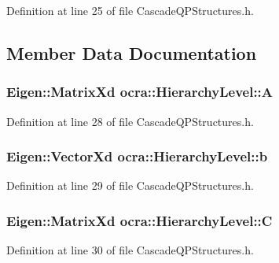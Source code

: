 Definition at line 25 of file Cascade\+Q\+P\+Structures.\+h.



\subsection{Member Data Documentation}
\subsubsection[{\texorpdfstring{A}{A}}]{\setlength{\rightskip}{0pt plus 5cm}Eigen\+::\+Matrix\+Xd ocra\+::\+Hierarchy\+Level\+::A}\hypertarget{structocra_1_1HierarchyLevel_a19bc3f9c063348621857c7bcc5c391c7}{}\label{structocra_1_1HierarchyLevel_a19bc3f9c063348621857c7bcc5c391c7}


Definition at line 28 of file Cascade\+Q\+P\+Structures.\+h.

\subsubsection[{\texorpdfstring{b}{b}}]{\setlength{\rightskip}{0pt plus 5cm}Eigen\+::\+Vector\+Xd ocra\+::\+Hierarchy\+Level\+::b}\hypertarget{structocra_1_1HierarchyLevel_aedcf136bbf54aa0ff910b3a3ce3d43be}{}\label{structocra_1_1HierarchyLevel_aedcf136bbf54aa0ff910b3a3ce3d43be}


Definition at line 29 of file Cascade\+Q\+P\+Structures.\+h.

\subsubsection[{\texorpdfstring{C}{C}}]{\setlength{\rightskip}{0pt plus 5cm}Eigen\+::\+Matrix\+Xd ocra\+::\+Hierarchy\+Level\+::C}\hypertarget{structocra_1_1HierarchyLevel_ad33118f78c391492062c6b3687c2e20d}{}\label{structocra_1_1HierarchyLevel_ad33118f78c391492062c6b3687c2e20d}


Definition at line 30 of file Cascade\+Q\+P\+Structures.\+h.

